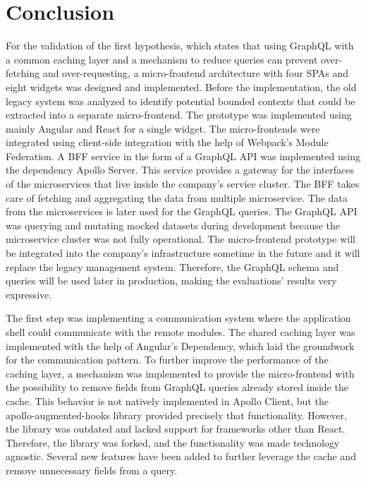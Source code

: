 \chapter{Conclusion}\label{chapter:conclusion}

\noindent For the validation of the first hypothesis, which states that using GraphQL with a common caching layer and a mechanism to reduce queries can prevent over-fetching and over-requesting, a micro-frontend architecture with four \acp{SPA} and eight widgets was designed and implemented. Before the implementation, the old legacy system was analyzed to identify potential bounded contexts that could be extracted into a separate micro-frontend. The prototype was implemented using mainly Angular and React for a single widget. The micro-frontends were integrated using client-side integration with the help of Webpack's Module Federation. A \ac{BFF} service in the form of a GraphQL \ac{API} was implemented using the dependency Apollo Server. This service provides a gateway for the interfaces of the microservices that live inside the company's service cluster. The \ac{BFF} takes care of fetching and aggregating the data from multiple microservice. The data from the microservices is later used for the GraphQL queries. The GraphQL \ac{API} was querying and mutating mocked datasets during development because the microservice cluster was not fully operational. The micro-frontend prototype will be integrated into the company's infrastructure sometime in the future and it will replace the legacy management system. Therefore, the GraphQL schema and queries will be used later in production, making the evaluations' results very expressive.

\bigskip

\noindent The first step was implementing a communication system where the application shell could communicate with the remote modules. The shared caching layer was implemented with the help of Angular's Dependency, which laid the groundwork for the communication pattern. To further improve the performance of the caching layer, a mechanism was implemented to provide the micro-frontend with the possibility to remove fields from GraphQL queries already stored inside the cache. This behavior is not natively implemented in Apollo Client, but the apollo-augmented-hooks library provided precisely that functionality. However, the library was outdated and lacked support for frameworks other than React. Therefore, the library was forked, and the functionality was made technology agnostic. Several new features have been added to further leverage the cache and remove unnecessary fields from a query.

